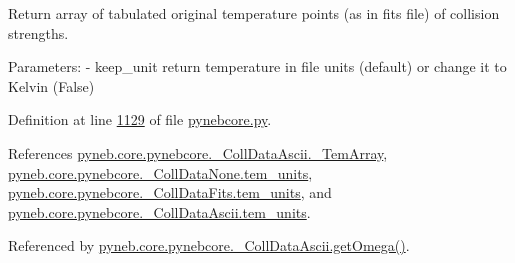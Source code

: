 \begin{DoxyVerb}Return array of tabulated original temperature points (as in fits file) 
    of collision strengths.

Parameters:
    - keep_unit   return temperature in file units (default) or change it to Kelvin (False)\end{DoxyVerb}
 

Definition at line \hyperlink{pynebcore_8py_source_l01129}{1129} of file \hyperlink{pynebcore_8py_source}{pynebcore.\-py}.



References \hyperlink{pynebcore_8py_source_l01000}{pyneb.\-core.\-pynebcore.\-\_\-\-Coll\-Data\-Ascii.\-\_\-\-Tem\-Array}, \hyperlink{pynebcore_8py_source_l00081}{pyneb.\-core.\-pynebcore.\-\_\-\-Coll\-Data\-None.\-tem\-\_\-units}, \hyperlink{pynebcore_8py_source_l00589}{pyneb.\-core.\-pynebcore.\-\_\-\-Coll\-Data\-Fits.\-tem\-\_\-units}, and \hyperlink{pynebcore_8py_source_l00944}{pyneb.\-core.\-pynebcore.\-\_\-\-Coll\-Data\-Ascii.\-tem\-\_\-units}.



Referenced by \hyperlink{pynebcore_8py_source_l01082}{pyneb.\-core.\-pynebcore.\-\_\-\-Coll\-Data\-Ascii.\-get\-Omega()}.


